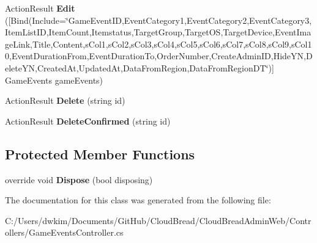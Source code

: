 \begin{DoxyCompactItemize}
\item 
Action\+Result {\bfseries Edit} (\mbox{[}Bind(Include=\char`\"{}Game\+Event\+ID,Event\+Category1,Event\+Category2,Event\+Category3,Item\+List\+ID,Item\+Count,Itemstatus,Target\+Group,Target\+OS,Target\+Device,Event\+Image\+Link,Title,Content,s\+Col1,s\+Col2,s\+Col3,s\+Col4,s\+Col5,s\+Col6,s\+Col7,s\+Col8,s\+Col9,s\+Col10,Event\+Duration\+From,Event\+Duration\+To,Order\+Number,Create\+Admin\+ID,Hide\+YN,Delete\+YN,Created\+At,Updated\+At,Data\+From\+Region,Data\+From\+Region\+DT\char`\"{})\mbox{]} Game\+Events game\+Events)\hypertarget{a00084_a8cf4442b12f5ca4f9d04d68d82a530d7}{}\label{a00084_a8cf4442b12f5ca4f9d04d68d82a530d7}

\item 
Action\+Result {\bfseries Delete} (string id)\hypertarget{a00084_a38e12ff4ecb98405ed9544bdc413aee0}{}\label{a00084_a38e12ff4ecb98405ed9544bdc413aee0}

\item 
Action\+Result {\bfseries Delete\+Confirmed} (string id)\hypertarget{a00084_a6d8873e561d1d02453ae2e6859e46692}{}\label{a00084_a6d8873e561d1d02453ae2e6859e46692}

\end{DoxyCompactItemize}
\subsection*{Protected Member Functions}
\begin{DoxyCompactItemize}
\item 
override void {\bfseries Dispose} (bool disposing)\hypertarget{a00084_a682b5d4169ab1b930a51b78f156a5ee5}{}\label{a00084_a682b5d4169ab1b930a51b78f156a5ee5}

\end{DoxyCompactItemize}


The documentation for this class was generated from the following file\+:\begin{DoxyCompactItemize}
\item 
C\+:/\+Users/dwkim/\+Documents/\+Git\+Hub/\+Cloud\+Bread/\+Cloud\+Bread\+Admin\+Web/\+Controllers/Game\+Events\+Controller.\+cs\end{DoxyCompactItemize}

